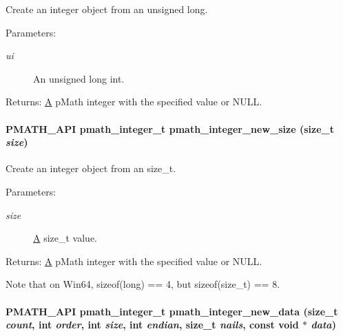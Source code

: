 Create an integer object from an unsigned long. 

\begin{Desc}
\item[Parameters:]
\begin{description}
\item[{\em ui}]An unsigned long int. \end{description}
\end{Desc}
\begin{Desc}
\item[Returns:]\hyperlink{class_a}{A} pMath integer with the specified value or NULL. \end{Desc}
\hypertarget{group__numbers_g5fecb78f68ce62c05b1970cf1cf17dc6}{
\paragraph[{pmath\_\-integer\_\-new\_\-size}]{\setlength{\rightskip}{0pt plus 5cm}PMATH\_\-API {\bf pmath\_\-integer\_\-t} pmath\_\-integer\_\-new\_\-size (size\_\-t {\em size})}\hfill}
\label{group__numbers_g5fecb78f68ce62c05b1970cf1cf17dc6}


Create an integer object from an size\_\-t. 

\begin{Desc}
\item[Parameters:]
\begin{description}
\item[{\em size}]\hyperlink{class_a}{A} size\_\-t value. \end{description}
\end{Desc}
\begin{Desc}
\item[Returns:]\hyperlink{class_a}{A} pMath integer with the specified value or NULL.\end{Desc}
Note that on Win64, sizeof(long) == 4, but sizeof(size\_\-t) == 8. \hypertarget{group__numbers_g7ffd98a7d3634c79d261b67f76b1d011}{
\paragraph[{pmath\_\-integer\_\-new\_\-data}]{\setlength{\rightskip}{0pt plus 5cm}PMATH\_\-API {\bf pmath\_\-integer\_\-t} pmath\_\-integer\_\-new\_\-data (size\_\-t {\em count}, \/  int {\em order}, \/  int {\em size}, \/  int {\em endian}, \/  size\_\-t {\em nails}, \/  const void $\ast$ {\em data})}\hfill}
\label{group__numbers_g7ffd98a7d3634c79d261b67f76b1d011}


